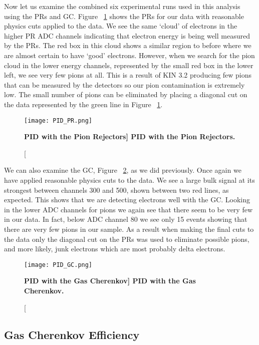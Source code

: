Now let us examine the combined six experimental runs used in this analysis using the PRs and GC. Figure ~\ref{fig:pid_pr} shows the PRs for our data with reasonable physics cuts applied to the data. We see the same `cloud' of electrons in the higher PR ADC channels indicating that electron energy is being well measured by the PRs. The red box in this cloud shows a similar region to before where we are almost certain to have `good' electrons. However, when we search for the pion cloud in the lower energy channels, represented by the small red box in the lower left, we see very few pions at all. This is a result of KIN 3.2 producing few pions that can be measured by the detectors so our pion contamination is extremely low. The small number of pions can be eliminated by placing a diagonal cut on the data represented by the green line in Figure ~\ref{fig:pid_pr}.

\begin{figure}[!ht]
\begin{center}
\texttt{[image: PID\_PR.png]}
\end{center}
\caption[\bf{PID with the Pion Rejectors}]{
{\bf{PID with the Pion Rejectors.}} }
\label{fig:pid_pr}
\end{figure}

We can also examine the GC, Figure ~\ref{fig:pid_gc}, as we did previously. Once again we have applied reasonable physics cuts to the data. We see a large bulk signal at its strongest between channels 300 and 500, shown between two red lines, as expected. This shows that we are detecting electrons well with the GC. Looking in the lower ADC channels for pions we again see that there seem to be very few in our data. In fact, below ADC channel 80 we see only 15 events showing that there are very few pions in our sample. As a result when making the final cuts to the data only the diagonal cut on the PRs was used to eliminate possible pions, and more likely, junk electrons which are most probably delta electrons.

\begin{figure}[!ht]
\begin{center}
\texttt{[image: PID\_GC.png]}
\end{center}
\caption[\bf{PID with the Gas Cherenkov}]{
{\bf{PID with the Gas Cherenkov.}} }
\label{fig:pid_gc}
\end{figure}

\subsection{Gas Cherenkov Efficiency}
\label{ssec:gc_eff}

